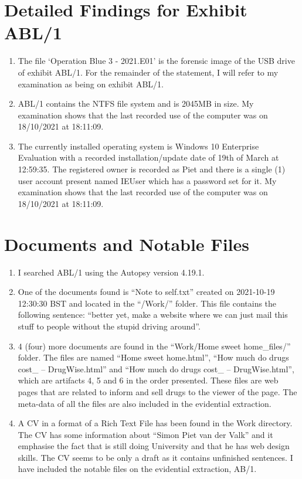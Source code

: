 \documentclass[11pt]{article}
\begin{document}
\section*{Detailed Findings for Exhibit ABL/1}
\begin{enumerate}[resume]
    \item The file ‘Operation Blue 3 - 2021.E01’ is the forensic image of the USB drive of exhibit ABL/1. For the remainder of the statement, I will refer to my examination as being on exhibit ABL/1.
    \item ABL/1 contains the NTFS file system and is 2045MB in size. My examination shows that the last recorded use of the computer was on 18/10/2021 at 18:11:09.
    \item The currently installed operating system is Windows 10 Enterprise Evaluation with a recorded installation/update date of 19th of March at 12:59:35. The registered owner is recorded as Piet and there is a single (1) user account present named IEUser which has a password set for it. My examination shows that the last recorded use of the computer was on 18/10/2021 at 18:11:09.
\end{enumerate}


\section*{Documents and Notable Files}
\begin{enumerate}[resume]
    \item I searched ABL/1 using the Autopsy version 4.19.1.
    \item One of the documents found is “Note to self.txt” created on 2021-10-19 12:30:30 BST and located in the “/Work/” folder. This file contains the following sentence: “better yet, make a website where we can just mail this stuff to people without the stupid driving around”.
    \item 4 (four) more documents are found in the “Work/Home sweet home\_files/” folder. The files are named “Home sweet home.html”, “How much do drugs cost\_ – DrugWise.html” and “How much do drugs cost\_ – DrugWise.html”, which are artifacts 4, 5 and 6 in the order presented. These files are web pages that are related to inform and sell drugs to the viewer of the page. The meta-data of all the files are also included in the evidential extraction.
    \item A CV in a format of a Rich Text File has been found in the Work directory. The CV has some information about “Simon Piet van der Valk” and it emphasise the fact that is still doing University and that he has web design skills. The CV seems to be only a draft as it contains unfinished sentences. I have included the notable files on the evidential extraction, AB/1.
\end{enumerate}
\end{document}

